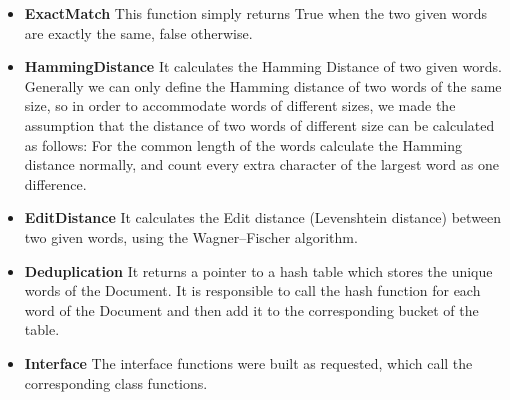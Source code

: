 \documentclass{article}
\begin{document}
\begin{itemize}
  \item \textbf{ExactMatch}
  This function simply returns True when the two given words are exactly the same, false otherwise.
  \item \textbf{HammingDistance}
  It calculates the Hamming Distance of two given words. Generally we can only define the Hamming distance of two words of the same size, so in order to accommodate words of different sizes, we made the assumption that the distance of two words of different size can be calculated as follows:
  For the common length of the words calculate the Hamming distance normally, and count every extra character of the largest word as one difference.
  \item \textbf{EditDistance}
  It calculates the Edit distance (Levenshtein distance) between two given words, using the Wagner–Fischer algorithm.
  \item \textbf{Deduplication} It returns a pointer to a hash table which stores the unique words of the Document. It is responsible to call the hash function for each word of the Document and then add it to the corresponding bucket of the table.
  \item \textbf{Interface} The interface functions were built as requested, which call the corresponding class functions.
\end{itemize}
\newpage
\end{document}
